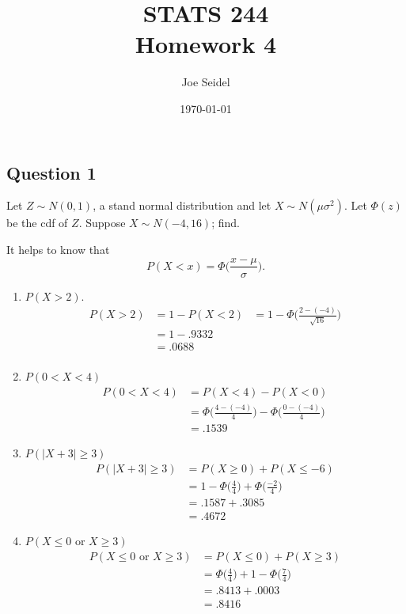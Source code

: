\documentclass{tufte-book}
\title{STATS 244 \\ Homework 4}
\author{Joe Seidel}
\date{\today}
\theoremstyle{mytheoremstyle}
\theoremstyle{mylemstyle}
\theoremstyle{mydefstyle}
\begin{document}
\maketitle
{}
\newpage
{}

\subsection{Question 1}
Let $Z \sim N(0,1)$, a stand normal distribution and let $X \sim N(\mu \sigma^2)$.  Let $\Phi(z)$ be the cdf of $Z$.  Suppose $X \sim N(-4, 16)$; find.

It helps to know that
\[ P(X < x) = \Phi\Big(\frac{x-\mu}{\sigma}\Big). \]

\begin{enumerate}
\item $P(X > 2)$.
\begin{align*}
P(X > 2) &= 1 - P(X < 2)
&= 1 - \Phi\Big(\frac{2- (-4)}{\sqrt{16}}\Big)\\
&= 1 - .9332\\
&= .0688\\
\end{align*}

\item $P(0 < X < 4)$
\begin{align*}
    P(0 < X < 4) &= P(X<4) - P(X<0)\\
    &= \Phi\Big(\frac{4 -(-4)}{4}\Big) - \Phi\Big(\frac{0 -(-4)}{4}\Big) \\
    &= .1539
\end{align*}

\item $P(|X+3| \geq 3)$
\begin{align*}
    P(|X+3| \geq 3) &= P(X \geq 0) + P(X \leq -6)\\
    &= 1-\Phi\Big(\frac{4}{4}\Big) + \Phi\Big(\frac{-2}{4}\Big)\\
    &= .1587 + .3085\\
    &= .4672
\end{align*}

\item $P(X \leq 0 \text{ or } X \geq 3)$
\begin{align*}
    P(X \leq 0 \text{ or } X \geq 3) &= P(X \leq 0) + P(X \geq 3)\\
    &= \Phi\Big(\frac{4}{4}\Big) + 1 - \Phi\Big(\frac{7}{4}\Big)\\
    &= .8413 + .0003\\
    &= .8416\\
\end{align*}

\end{enumerate}
\end{document}
